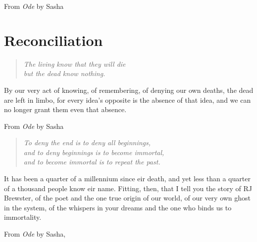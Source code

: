 \documentclass[11pt]{memoir}
\begin{document}
  \vspace{1em}

  From \emph{Ode} by Sasha
  \vfill

  
  
  
  
  
  
  
  
  
  
  

  \part{Reconciliation}
  \begin{quote}\itshape
    The living know that they will die \\
    but the dead know nothing.
  \end{quote}

  \noindent By our very act of knowing, of remembering, of denying our own deaths, the dead are left in limbo, for every idea's opposite is the absence of that idea, and we can no longer grant them even that absence.

  \vspace{1em}

  From \emph{Ode} by Sasha

  \vfill

  
  
  
  
  
  
  
  
  

  \cleardoublepage
  \thispagestyle{empty}
  \null
  \vfill
  \begin{quote}\itshape
    To deny the end is to deny all beginnings, \\
    and to deny beginnings is to become immortal, \\
    and to become immortal is to repeat the past.
  \end{quote}

  \noindent It has been a quarter of a millennium since eir death, and yet less than a quarter of a thousand people know eir name. Fitting, then, that I tell you the story of RJ Brewster, of the poet and the one true origin of our world, of our very own ghost in the system, of the whispers in your dreams and the one who binds us to immortality.

  \vspace{1em}

  From \emph{Ode} by Sasha,
\end{document}
